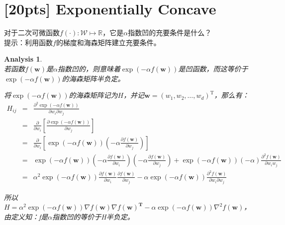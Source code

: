 \documentclass[a4paper,UTF8]{article}
\numberwithin{equation}{section}
\newtheorem*{myAnalysis}{Analysis}
\begin{document}
\section{[20pts] Exponentially Concave}
\noindent 对于二次可微函数$f(\cdot):\mathcal{W} \mapsto \mathbb{R}$，它是$\alpha$指数凹的充要条件是什么？\\
提示：利用函数$f$的梯度和海森矩阵建立充要条件。
\begin{myAnalysis}~\\
	
若函数$f(\mathbf{w})$是$\alpha$指数凹的，则意味着$\exp(-\alpha f(\mathbf{w}))$是凹函数，而这等价于$\exp(-\alpha f(\mathbf{w}))$的海森矩阵半负定。

将$\exp(-\alpha f(\mathbf{w}))$的海森矩阵记为$H$，并记$\mathbf{w} = (w_1, w_2, \ldots, w_d)^\mathrm{T}$，那么有：
\begin{eqnarray*}
H_{ij} &=& \frac{\partial^2 \exp(-\alpha f(\mathbf{w}))} { \partial w_i \partial w_j } \\
&=& \frac{\partial}{\partial w_i} \left[ \frac{\partial \exp(-\alpha f(\mathbf{w}))} { \partial w_j } \right] \\
&=& \frac{\partial}{\partial w_i} \left[ \exp(-\alpha f(\mathbf{w})) (-\alpha \frac{\partial f(\mathbf{w})}{\partial w_j}) \right] \\
&=& \exp(-\alpha f(\mathbf{w})) (-\alpha \frac{\partial f(\mathbf{w})}{\partial w_i}) (-\alpha \frac{\partial f(\mathbf{w})}{\partial w_j}) + \exp(-\alpha f(\mathbf{w})) (-\alpha) \frac{\partial^2f(\mathbf{w})}{\partial w_i w_j} \\
&=& \alpha^2 \exp(-\alpha f(\mathbf{w})) \frac{\partial f(\mathbf{w})}{\partial w_i} \frac{\partial f(\mathbf{w})}{\partial w_j} - \alpha \exp(-\alpha f(\mathbf{w})) \frac{\partial^2 f(\mathbf{w})}{\partial w_i \partial w_j}
\end{eqnarray*}

所以$H = \alpha^2 \exp(-\alpha f(\mathbf{w})) \nabla f(\mathbf{w}) \nabla f(\mathbf{w}) ^ \mathbf{T} - \alpha \exp(-\alpha f(\mathbf{w})) \nabla^2 f(\mathbf{w})$，由定义知：f是$\alpha$指数凹的等价于H半负定。

	~\\	
	~\\
\end{myAnalysis}

\newpage
\end{document}
